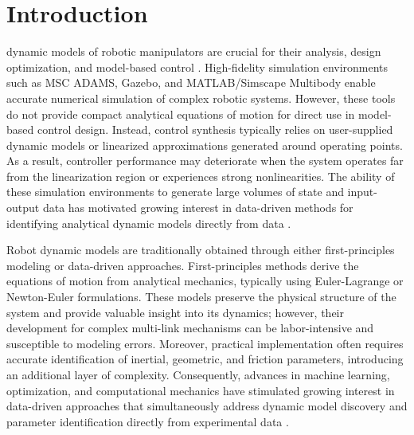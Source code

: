 \documentclass[lettersize,journal]{IEEEtran}
\begin{document}
\section{Introduction}
 dynamic models of robotic manipulators are crucial for their analysis, design optimization, and model-based control \cite{Tsai.1999, Spong2020}. High-fidelity simulation environments such as MSC ADAMS, Gazebo, and MATLAB/Simscape Multibody enable accurate numerical simulation of complex robotic systems. However, these tools do not provide compact analytical equations of motion for direct use in model-based control design. Instead, control synthesis typically relies on user-supplied dynamic models or linearized approximations generated around operating points. As a result, controller performance may deteriorate when the system operates far from the linearization region or experiences strong nonlinearities. The ability of these simulation environments to generate large volumes of state and input-output data has motivated growing interest in data-driven methods for identifying analytical dynamic models directly from data \cite{omar2022framework,omar2024robust,omar2025r,Karniadakis2021}.

Robot dynamic models are traditionally obtained through either first-principles modeling or data-driven approaches. First-principles methods derive the equations of motion from analytical mechanics, typically using Euler-Lagrange or Newton-Euler formulations. These models preserve the physical structure of the system and provide valuable insight into its dynamics; however, their development for complex multi-link mechanisms can be labor-intensive and susceptible to modeling errors. Moreover, practical implementation often requires accurate identification of inertial, geometric, and friction parameters, introducing an additional layer of complexity. Consequently, advances in machine learning, optimization, and computational mechanics have stimulated growing interest in data-driven approaches that simultaneously address dynamic model discovery and parameter identification directly from experimental data \cite{hashemi2023multibody, StevenL.Brunton.2016, NguyenTuong2011}.
\end{document}
